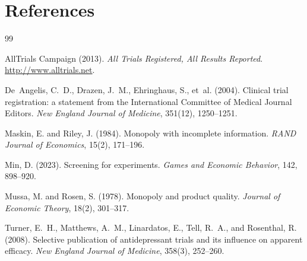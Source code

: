 \documentclass[12pt,a4paper]{article}
\begin{document}
\section*{References}

\begin{thebibliography}{99}

AllTrials Campaign (2013).
\emph{All Trials Registered, All Results Reported}.
\url{http://www.alltrials.net}.

De~Angelis, C.~D., Drazen, J.~M., Ehringhaus, S., et~al.
  (2004).
Clinical trial registration: a statement from the
  International Committee of Medical Journal Editors.
\emph{New England Journal of Medicine}, 351(12), 1250--1251.

Maskin, E. and Riley, J. (1984).
Monopoly with incomplete information.
\emph{RAND Journal of Economics}, 15(2), 171--196.

Min, D. (2023).
Screening for experiments.
\emph{Games and Economic Behavior}, 142, 898--920.

Mussa, M. and Rosen, S. (1978).
Monopoly and product quality.
\emph{Journal of Economic Theory}, 18(2), 301--317.

Turner, E.~H., Matthews, A.~M., Linardatos, E., Tell,
  R.~A., and Rosenthal, R. (2008).
Selective publication of antidepressant trials and its
  influence on apparent efficacy.
\emph{New England Journal of Medicine}, 358(3), 252--260.

\end{thebibliography}
\end{document}
